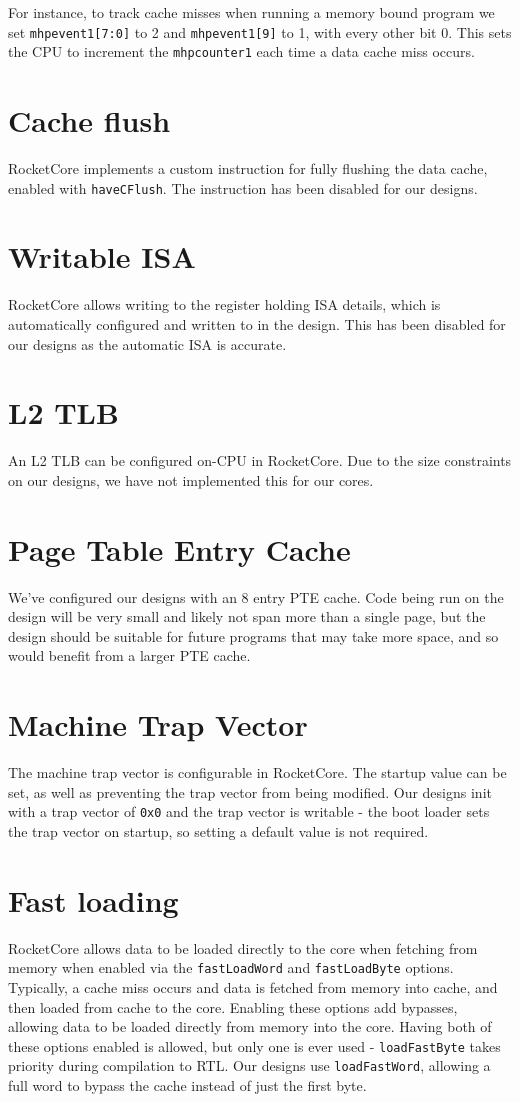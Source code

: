 For instance, to track cache misses when running a memory bound program we set \texttt{mhpevent1[7:0]} to 2 and \texttt{mhpevent1[9]} to 1, with every other bit 0. This sets the CPU to increment the \texttt{mhpcounter1} each time a data cache miss occurs.

\section{Cache flush}
RocketCore implements a custom instruction for fully flushing the data cache, enabled with \texttt{haveCFlush}. The instruction has been disabled for our designs.

\section{Writable ISA}
RocketCore allows writing to the register holding ISA details, which is automatically configured and written to in the design. This has been disabled for our designs as the automatic ISA is accurate.

\section{L2 TLB}
An L2 TLB can be configured on-CPU in RocketCore. Due to the size constraints on our designs, we have not implemented this for our cores.

\section{Page Table Entry Cache}
We've configured our designs with an 8 entry PTE cache. Code being run on the design will be very small and likely not span more than a single page, but the design should be suitable for future programs that may take more space, and so would benefit from a larger PTE cache.

\section{Machine Trap Vector}
The machine trap vector is configurable in RocketCore. The startup value can be set, as well as preventing the trap vector from being modified. Our designs init with a trap vector of \texttt{0x0} and the trap vector is writable - the boot loader sets the trap vector on startup, so setting a default value is not required.

\section{Fast loading}
RocketCore allows data to be loaded directly to the core when fetching from memory when enabled via the \texttt{fastLoadWord} and \texttt{fastLoadByte} options. Typically, a cache miss occurs and data is fetched from memory into cache, and then loaded from cache to the core. Enabling these options add bypasses, allowing data to be loaded directly from memory into the core. Having both of these options enabled is allowed, but only one is ever used - \texttt{loadFastByte} takes priority during compilation to RTL. Our designs use \texttt{loadFastWord}, allowing a full word to bypass the cache instead of just the first byte.

